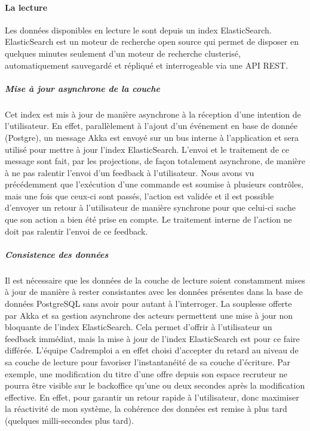 \paragraph{La lecture}
\label{par:La lecture}
Les données disponibles en lecture le sont depuis un index ElasticSearch.
\label{def:ElasticSearch}ElasticSearch est un moteur de recherche open source qui permet de disposer en quelques minutes seulement d'un moteur de recherche clusterisé, automatiquement sauvegardé et répliqué et interrogeable via une API REST.
\subparagraph{Mise à jour asynchrone de la couche}
Cet index est mis à jour de manière asynchrone à la réception d'une intention de l'utilisateur.
En effet, parallèlement à l'ajout d'un événement en base de donnée (Postgre), un message Akka est envoyé sur un bus interne à l'application et sera utilisé pour mettre à jour l'index ElasticSearch.
L'envoi et le traitement de ce message sont fait, par les projections, de façon totalement asynchrone, de manière à ne pas ralentir l'envoi d'un feedback à l'utilisateur.
Nous avons vu précédemment que l'exécution d'une commande est soumise à plusieurs contrôles, mais une fois que ceux-ci sont passés, l'action est validée et il est possible d'envoyer un retour à l'utilisateur de manière synchrone pour que celui-ci sache que son action a bien été prise en compte.
Le traitement interne de l'action ne doit pas ralentir l'envoi de ce feedback.
\subparagraph{Consistence des données}
Il est nécessaire que les données de la couche de lecture soient constamment mises à jour de manière à rester consistantes avec les données présentes dans la base de données PostgreSQL sans avoir pour autant à l'interroger.
La souplesse offerte par Akka et sa gestion asynchrone des acteurs permettent une mise à jour non bloquante de l'index ElasticSearch.
Cela permet d'offrir à l'utilisateur un feedback immédiat, mais la mise à jour de l'index ElasticSearch est pour ce faire différée.
L'équipe Cadremploi a en effet choisi d'accepter du retard au niveau de sa couche de lecture pour favoriser l'instantanéité de sa couche d'écriture.
Par exemple, une modification du titre d'une offre depuis son espace recruteur ne pourra être visible sur le backoffice qu'une ou deux secondes après la modification effective.
En effet, pour garantir un retour rapide à l'utilisateur, donc maximiser la réactivité de mon système, la cohérence des données est remise à plus tard (quelques milli-secondes plus tard).

